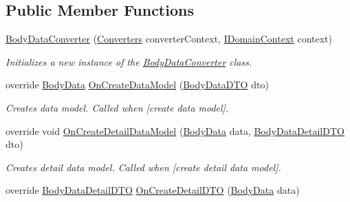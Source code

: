 \subsection*{Public Member Functions}
\begin{DoxyCompactItemize}
\item 
\mbox{\hyperlink{class_bar_none_1_1_shared_1_1_data_converters_1_1_body_data_converter_ac16b3fc537fb704a88f91b52f06f7270}{Body\+Data\+Converter}} (\mbox{\hyperlink{class_bar_none_1_1_shared_1_1_data_converters_1_1_converters}{Converters}} converter\+Context, \mbox{\hyperlink{interface_bar_none_1_1_shared_1_1_core_1_1_i_domain_context}{I\+Domain\+Context}} context)
\begin{DoxyCompactList}\small\item\em Initializes a new instance of the \mbox{\hyperlink{class_bar_none_1_1_shared_1_1_data_converters_1_1_body_data_converter}{Body\+Data\+Converter}} class. \end{DoxyCompactList}\item 
override \mbox{\hyperlink{class_bar_none_1_1_shared_1_1_domain_model_1_1_body_data}{Body\+Data}} \mbox{\hyperlink{class_bar_none_1_1_shared_1_1_data_converters_1_1_body_data_converter_a07e8157284ed612bb9aad36be2b4c534}{On\+Create\+Data\+Model}} (\mbox{\hyperlink{class_bar_none_1_1_shared_1_1_data_transfer_1_1_body_data_d_t_o}{Body\+Data\+D\+TO}} dto)
\begin{DoxyCompactList}\small\item\em Creates data model. Called when \mbox{[}create data model\mbox{]}. \end{DoxyCompactList}\item 
override void \mbox{\hyperlink{class_bar_none_1_1_shared_1_1_data_converters_1_1_body_data_converter_a187a7bce16901306c5e03ab1aed479f5}{On\+Create\+Detail\+Data\+Model}} (\mbox{\hyperlink{class_bar_none_1_1_shared_1_1_domain_model_1_1_body_data}{Body\+Data}} data, \mbox{\hyperlink{class_bar_none_1_1_shared_1_1_data_transfer_1_1_body_data_detail_d_t_o}{Body\+Data\+Detail\+D\+TO}} dto)
\begin{DoxyCompactList}\small\item\em Creates detail data model. Called when \mbox{[}create detail data model\mbox{]}. \end{DoxyCompactList}\item 
override \mbox{\hyperlink{class_bar_none_1_1_shared_1_1_data_transfer_1_1_body_data_detail_d_t_o}{Body\+Data\+Detail\+D\+TO}} \mbox{\hyperlink{class_bar_none_1_1_shared_1_1_data_converters_1_1_body_data_converter_a7b4660f115e22c810a6863f06560cf24}{On\+Create\+Detail\+D\+TO}} (\mbox{\hyperlink{class_bar_none_1_1_shared_1_1_domain_model_1_1_body_data}{Body\+Data}} data)

\end{DoxyCompactItemize}
